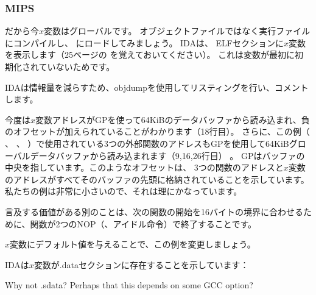 \subsubsection{MIPS}


だから今$x$変数はグローバルです。 
オブジェクトファイルではなく実行ファイルにコンパイルし、 \IDA にロードしてみましょう。 
IDAは、 ELFセクションに$x$変数を表示します（25ページの を覚えておいてください）。
これは変数が最初に初期化されていないためです。



IDAは情報量を減らすため、objdumpを使用してリスティングを行い、コメントします。



今度は$x$変数アドレスがGPを使って64KiBのデータバッファから読み込まれ、負のオフセットが加えられていることがわかります（18行目）。 
さらに、この例（ \puts 、 \scanf 、 \printf ）で使用されている3つの外部関数のアドレスもGPを使用して64KiBグローバルデータバッファから読み込まれます（9,16,26行目） 。 
GPはバッファの中央を指しています。このようなオフセットは、
3つの関数のアドレスと$x$変数のアドレスがすべてそのバッファの先頭に格納されていることを示しています。 
私たちの例は非常に小さいので、それは理にかなっています。


言及する価値がある別のことは、次の関数の開始を16バイトの境界に合わせるために、関数が2つの\ac{NOP}（、アイドル命令）で終了することです。


$x$変数にデフォルト値を与えることで、この例を変更しましょう。



IDAは$x$変数が.dataセクションに存在することを示しています：



Why not .sdata? Perhaps that this depends on some GCC option?

